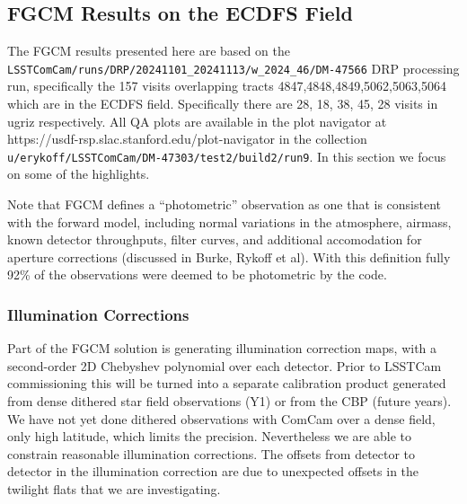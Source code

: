 \subsection{FGCM Results on the ECDFS Field}

The FGCM results presented here are based on the
\texttt{LSSTComCam/runs/DRP/20241101\_20241113/w\_2024\_46/DM-47566} DRP processing
run, specifically the 157 visits overlapping tracts
4847,4848,4849,5062,5063,5064 which are in the ECDFS field. Specifically there
are 28, 18, 38, 45, 28 visits in ugriz respectively. All QA plots are available
in the plot navigator at https://usdf-rsp.slac.stanford.edu/plot-navigator in
the collection \texttt{u/erykoff/LSSTComCam/DM-47303/test2/build2/run9}.  In this
section we focus on some of the highlights.

Note that FGCM defines a ``photometric'' observation as one that is consistent
with the forward model, including normal variations in the atmosphere, airmass,
known detector throughputs, filter curves, and additional accomodation for
aperture corrections (discussed in Burke, Rykoff et al).  With this definition
fully 92\% of the observations were deemed to be photometric by the code.

\subsubsection{Illumination Corrections}

Part of the FGCM solution is generating illumination correction maps, with a
second-order 2D Chebyshev polynomial over each detector.  Prior to LSSTCam
commissioning this will be turned into a separate calibration product generated
from dense dithered star field observations (Y1) or from the CBP (future
years). We have not yet done dithered observations with ComCam over a dense
field, only high latitude, which limits the precision.  Nevertheless we are
able to constrain reasonable illumination corrections.  The offsets from
detector to detector in the illumination correction are due to unexpected
offsets in the twilight flats that we are investigating.

